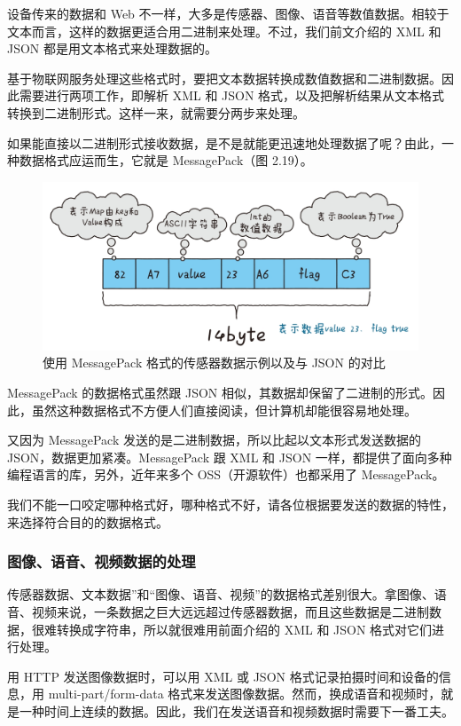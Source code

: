 \documentclass[12pt,UTF8]{ctexbook}
\begin{document}
设备传来的数据和 Web 不一样，大多是传感器、图像、语音等数值数据。相较于文本而言，这样的数据更适合用二进制来处理。不过，我们前文介绍的 XML 和 JSON 都是用文本格式来处理数据的。

基于物联网服务处理这些格式时，要把文本数据转换成数值数据和二进制数据。因此需要进行两项工作，即解析 XML 和 JSON 格式，以及把解析结果从文本格式转换到二进制形式。这样一来，就需要分两步来处理。

如果能直接以二进制形式接收数据，是不是就能更迅速地处理数据了呢？由此，一种数据格式应运而生，它就是 MessagePack（图 2.19）。

\begin{figure}[htbp]
	\centering
	\includegraphics[width=1\linewidth]{38}
	\caption{使用 MessagePack 格式的传感器数据示例以及与 JSON 的对比}
	\label{fig:1}
\end{figure}

MessagePack 的数据格式虽然跟 JSON 相似，其数据却保留了二进制的形式。因此，虽然这种数据格式不方便人们直接阅读，但计算机却能很容易地处理。

又因为 MessagePack 发送的是二进制数据，所以比起以文本形式发送数据的 JSON，数据更加紧凑。MessagePack 跟 XML 和 JSON 一样，都提供了面向多种编程语言的库，另外，近年来多个 OSS（开源软件）也都采用了 MessagePack。

我们不能一口咬定哪种格式好，哪种格式不好，请各位根据要发送的数据的特性，来选择符合目的的数据格式。

\subsubsection{图像、语音、视频数据的处理}

传感器数据、文本数据”和“图像、语音、视频”的数据格式差别很大。拿图像、语音、视频来说，一条数据之巨大远远超过传感器数据，而且这些数据是二进制数据，很难转换成字符串，所以就很难用前面介绍的 XML 和 JSON 格式对它们进行处理。

用 HTTP 发送图像数据时，可以用 XML 或 JSON 格式记录拍摄时间和设备的信息，用 multi-part/form-data 格式来发送图像数据。然而，换成语音和视频时，就是一种时间上连续的数据。因此，我们在发送语音和视频数据时需要下一番工夫。
\end{document}

